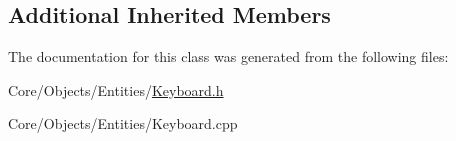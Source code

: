 \subsection*{Additional Inherited Members}


The documentation for this class was generated from the following files\-:\begin{DoxyCompactItemize}
\item 
Core/\-Objects/\-Entities/\hyperlink{Keyboard_8h}{Keyboard.\-h}\item 
Core/\-Objects/\-Entities/Keyboard.\-cpp\end{DoxyCompactItemize}
